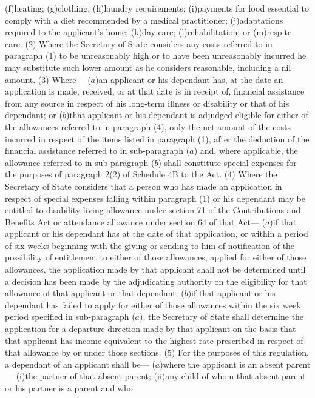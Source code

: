 \documentclass[a4paper]{article}
\begin{document}
(f)heating;
(g)clothing;
(h)laundry requirements;
(i)payments for food essential to comply with a diet recommended by a medical
practitioner;
(j)adaptations required to the applicant’s home;
(k)day care;
(l)rehabilitation; or
(m)respite care.
(2) Where the Secretary of State considers any costs referred to in paragraph
(1) to be unreasonably high or to have been unreasonably incurred he may
substitute such lower amount as he considers reasonable, including a nil amount.
(3) Where—
($a$)an applicant or his dependant has, at the date an application is made,
received, or at that date is in receipt of, financial assistance from any source
in respect of his long-term illness or disability or that of his dependant; or
($b$)that applicant or his dependant is adjudged eligible for either of the
allowances referred to in paragraph (4),
only the net amount of the costs incurred in respect of the items listed in
paragraph (1), after the deduction of the financial assistance referred to in
sub-paragraph ($a$) and, where applicable, the allowance referred to in
sub-paragraph ($b$) shall constitute special expenses for the purposes of
paragraph 2(2) of Schedule 4B to the Act.
(4) Where the Secretary of State considers that a person who has made an
application in respect of special expenses falling within paragraph (1) or his
dependant may be entitled to disability living allowance under section 71 of the
Contributions and Benefits Act or attendance allowance under section 64 of that
Act—
($a$)if that applicant or his dependant has at the date of that application, or
within a period of six weeks beginning with the giving or sending to him of
notification of the possibility of entitlement to either of those allowances,
applied for either of those allowances, the application made by that applicant
shall not be determined until a decision has been made by the adjudicating
authority on the eligibility for that allowance of that applicant or that
dependant;
($b$)if that applicant or his dependant has failed to apply for either of those
allowances within the six week period specified in sub-paragraph ($a$), the
Secretary of State shall determine the application for a departure direction
made by that applicant on the basis that that applicant has income equivalent to
the highest rate prescribed in respect of that allowance by or under those
sections.
(5) For the purposes of this regulation, a dependant of an applicant shall be—
($a$)where the applicant is an absent parent—
(i)the partner of that absent parent;
(ii)any child of whom that absent parent or his partner is a parent and who
\end{document}
